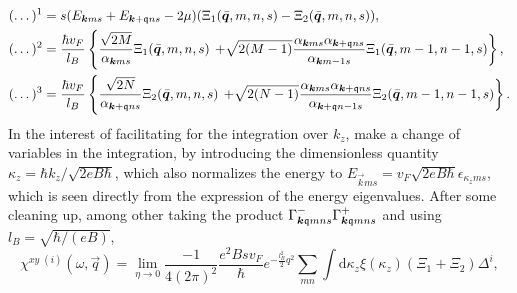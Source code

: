 \begin{align}
  (\dots )^1 &= s(E_{\bm{k} m s} + E_{\bm{k} + \mathfrak{q} ns} - 2\mu ) (\Xi _{1} (\bar{\bm{q}}, m, n, s) - \Xi _2(\bar{\bm{q}}, m, n, s)),\\
  (\dots)^2 &= \frac{\hbar v_F}{l_B}
                                                           \left\{
                                                             \frac{\sqrt{2M}}{\alpha _{\bm{k} m s} }
                                                             \Xi_1(\bar{\bm{q}}, m, n, s)
                                                             \right.
                                                             \left.+
                                                             \sqrt{2(M-1)}
                                                             \frac{\alpha _{\bm{k} m s} \alpha _{\bm{k} + \mathfrak{q} n s}}{\alpha _{\bm{k} m-1 s}}
                                                             \Xi_1(\bar{\bm{q}}, m-1, n -1, s)
                                                           \right\},\\
  (\dots )^3 &= \frac{\hbar  v_F}{l_B}
                                                           \left\{
                                                             \frac{\sqrt{2 N} }{\alpha _{\bm{k} + \mathfrak{q} n s}}
                                                             \Xi _2(\bar{\bm{q}}, m, n, s)
                                                             \right.
                                                             \left.+
                                                             \sqrt{2(N-1)}
                                                             \frac{\alpha _{\bm{k} m s} \alpha _{\bm{k} + \mathfrak{q} n s}}{\alpha _{\bm{k} + \mathfrak{q} n-1 s}}
                                                             \Xi _2(\bar{\bm{q}}, m-1, n-1, s)
                                                           \right\}.
\end{align}
In the interest of facilitating for the integration over $k_z$, make a change of variables in the integration, by introducing the dimensionless quantity $\kappa_z = \hbar  k_z /\sqrt{2 e B \hbar }$, which also normalizes the energy to $E_{\vec{k} m s} = v_F \sqrt{2 e B \hbar } \mathcal{\epsilon}_{\kappa _z m s}$, which is seen directly from the expression of the energy eigenvalues.
After some cleaning up, among other taking the product $\Gamma ^-_{\bm{k}\mathfrak{q} m n s} \Gamma ^+_{\bm{k}\mathfrak{q} m n s}$ and using $l_B = \sqrt{\hbar /(e B)}$,
\begin{equation}
  \chi ^{xy\; (i)} (\omega , \vec{q}) =
  \lim_{\eta \to 0}
  \frac{-1}{4(2\pi )^2}
  \frac{e^2 B s v_F}{\hbar }
  e^{-\frac{l_B^2}{2} q^2}
  \sum\limits_{mn}^{}
  \int \mathrm{d} \kappa _z
  \xi(\kappa_z)
  \left( \Xi _1  + \Xi _2 \right)
  \Delta ^i,
\end{equation}
